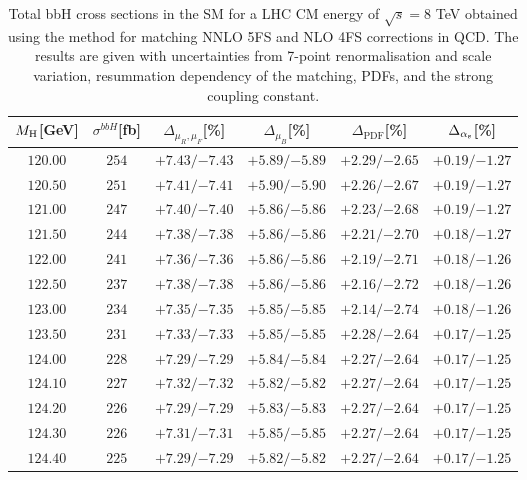 \begin{table}[ht!]
\caption{Total bbH{} cross sections in the SM for a LHC CM energy of $\sqrt{s}=8$ TeV obtained using the \nlonnllpart{} method for matching NNLO 5FS and NLO 4FS corrections in QCD. The results are given with uncertainties from 7-point renormalisation and scale variation, resummation dependency of the matching, PDFs, and the strong coupling constant.}
\label{tab:bbH8}
\begin{center}%
\begin{small}%
\begin{tabular}{cccccc}%
\toprule
$M_\mathrm{H}$[GeV] & $\sigma^{bbH}$[fb] & $\Delta_{\mu_{R},\mu_{F}}$[\%] & $\Delta_{\mu_{B}}$[\%] & $\Delta_{\mathrm{PDF}}$[\%] & $\Delta_{\alpha_{\mathrm{s}}}$[\%] \\
\midrule
$120.00$ & $254$ & ${+7.43}/{-7.43}$ & ${+5.89}/{-5.89}$ & ${+2.29}/{-2.65}$ & ${+0.19}/{-1.27}$ \\
$120.50$ & $251$ & ${+7.41}/{-7.41}$ & ${+5.90}/{-5.90}$ & ${+2.26}/{-2.67}$ & ${+0.19}/{-1.27}$ \\
$121.00$ & $247$ & ${+7.40}/{-7.40}$ & ${+5.86}/{-5.86}$ & ${+2.23}/{-2.68}$ & ${+0.19}/{-1.27}$ \\
$121.50$ & $244$ & ${+7.38}/{-7.38}$ & ${+5.86}/{-5.86}$ & ${+2.21}/{-2.70}$ & ${+0.18}/{-1.27}$ \\
$122.00$ & $241$ & ${+7.36}/{-7.36}$ & ${+5.86}/{-5.86}$ & ${+2.19}/{-2.71}$ & ${+0.18}/{-1.26}$ \\
$122.50$ & $237$ & ${+7.38}/{-7.38}$ & ${+5.86}/{-5.86}$ & ${+2.16}/{-2.72}$ & ${+0.18}/{-1.26}$ \\
$123.00$ & $234$ & ${+7.35}/{-7.35}$ & ${+5.85}/{-5.85}$ & ${+2.14}/{-2.74}$ & ${+0.18}/{-1.26}$ \\
$123.50$ & $231$ & ${+7.33}/{-7.33}$ & ${+5.85}/{-5.85}$ & ${+2.28}/{-2.64}$ & ${+0.17}/{-1.25}$ \\
$124.00$ & $228$ & ${+7.29}/{-7.29}$ & ${+5.84}/{-5.84}$ & ${+2.27}/{-2.64}$ & ${+0.17}/{-1.25}$ \\
$124.10$ & $227$ & ${+7.32}/{-7.32}$ & ${+5.82}/{-5.82}$ & ${+2.27}/{-2.64}$ & ${+0.17}/{-1.25}$ \\
$124.20$ & $226$ & ${+7.29}/{-7.29}$ & ${+5.83}/{-5.83}$ & ${+2.27}/{-2.64}$ & ${+0.17}/{-1.25}$ \\
$124.30$ & $226$ & ${+7.31}/{-7.31}$ & ${+5.85}/{-5.85}$ & ${+2.27}/{-2.64}$ & ${+0.17}/{-1.25}$ \\
$124.40$ & $225$ & ${+7.29}/{-7.29}$ & ${+5.82}/{-5.82}$ & ${+2.27}/{-2.64}$ & ${+0.17}/{-1.25}$ \\

\end{tabular}
\end{small}
\end{center}
\end{table}
